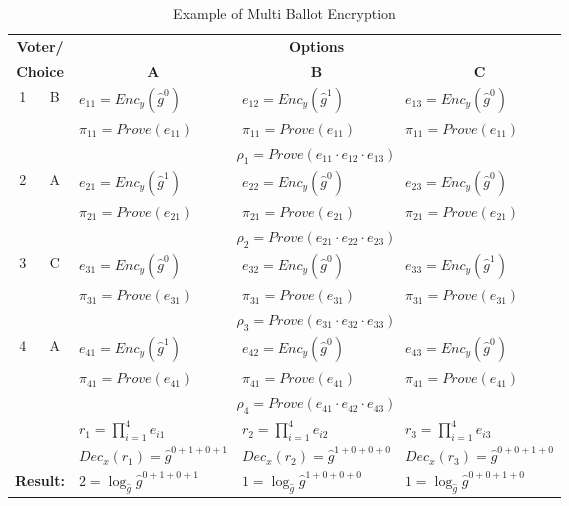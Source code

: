 \documentclass[numbers=noenddot, abstract=on, a4paper, headsepline,
footsepline, oneside, draft=off]{scrreprt}
\begin{document}
\begin{table}[htbp]
	\centering
	\renewcommand{\arraystretch}{1.4}
	\begin{minipage}{\linewidth}
	\begin{tabularx}{\textwidth}{cclll}
		\toprule
		\multicolumn{2}{c}{\textbf{Voter/}}  &  \multicolumn{3}{c}{\textbf{Options}}
		\\
		\multicolumn{2}{c}{\textbf{Choice}}	& 	\multicolumn{1}{c}{\textbf{A}}	&
		\multicolumn{1}{c}{\textbf{B}} &
		\multicolumn{1}{c}{\textbf{C}}
		\\
		\midrule
		\multirow{3}{*}{1} & \multirow{3}{*}{B} &	$e_{11}=Enc_y(\hat{g}^0)$	&
		$e_{12}=Enc_y(\hat{g}^1)$ & $e_{13}=Enc_y(\hat{g}^0)$ \\
		& & $\pi_{11}=Prove(e_{11})$ & $\pi_{11}=Prove(e_{11})$ &
		$\pi_{11}=Prove(e_{11})$ \\	
		& & \multicolumn{3}{c}{$\rho_1=Prove(e_{11}\cdot e_{12} \cdot e_{13})$} \\
		[1.5ex]
		\multirow{3}{*}{2} & \multirow{3}{*}{A} &	$e_{21}=Enc_y(\hat{g}^1)$	&
		$e_{22}=Enc_y(\hat{g}^0)$ & $e_{23}=Enc_y(\hat{g}^0)$ \\
		& & $\pi_{21}=Prove(e_{21})$ & $\pi_{21}=Prove(e_{21})$ &
		$\pi_{21}=Prove(e_{21})$ \\	
		& & \multicolumn{3}{c}{$\rho_2=Prove(e_{21}\cdot e_{22} \cdot e_{23})$} \\
		[1.5ex]
		\multirow{3}{*}{3} & \multirow{3}{*}{C} &	$e_{31}=Enc_y(\hat{g}^0)$	&
		$e_{32}=Enc_y(\hat{g}^0)$ & $e_{33}=Enc_y(\hat{g}^1)$ \\
		& & $\pi_{31}=Prove(e_{31})$ & $\pi_{31}=Prove(e_{31})$ &
		$\pi_{31}=Prove(e_{31})$ \\	
		& & \multicolumn{3}{c}{$\rho_3=Prove(e_{31}\cdot e_{32} \cdot e_{33})$} \\
		[1.5ex]
		\multirow{3}{*}{4} & \multirow{3}{*}{A} &	$e_{41}=Enc_y(\hat{g}^1)$	&
		$e_{42}=Enc_y(\hat{g}^0)$ & $e_{43}=Enc_y(\hat{g}^0)$ \\
		& & $\pi_{41}=Prove(e_{41})$ & $\pi_{41}=Prove(e_{41})$ &
		$\pi_{41}=Prove(e_{41})$ \\	
		& & \multicolumn{3}{c}{$\rho_4=Prove(e_{41}\cdot e_{42} \cdot e_{43})$}	\\ 
		[1.5ex]
		\midrule
		& & $r_1 = \displaystyle\prod_{i=1}^4 e_{i1}$ & $r_2 =
		\displaystyle\prod_{i=1}^4 e_{i2}$ & $r_3 = \displaystyle\prod_{i=1}^4 e_{i3}$
		\\[1.5ex]
		& & $Dec_x(r_1) = \hat{g}^{0+1+0+1}$ & $Dec_x(r_2) = \hat{g}^{1+0+0+0}$ &
		$Dec_x(r_3) = \hat{g}^{0+0+1+0}$ \\ [1.5ex]
		\multicolumn{2}{l}{\textbf{Result:}} & $2 = \log_{\hat{g}} \hat{g}^{0+1+0+1}$ & $1 =
		\log_{\hat{g}} \hat{g}^{1+0+0+0}$ & $1 = \log_{\hat{g}} \hat{g}^{0+0+1+0}$
		\\ [1.5ex]
		\bottomrule
	\end{tabularx}
	\end{minipage}
	\renewcommand{\arraystretch}{1}
	\caption{Example of Multi Ballot Encryption}
	\label{tab:multiencryption}
\end{table}
\end{document}
